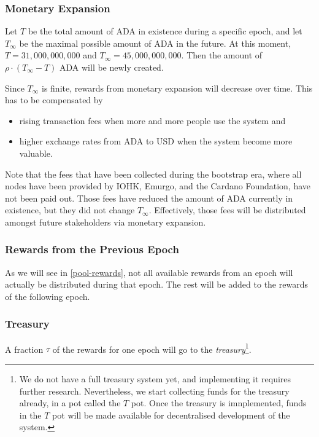 \documentclass[11pt,a4paper]{article}
\begin{document}
\subsubsection{Monetary Expansion}
\label{monetary-expansion}

Let \(T\) be the total amount of ADA in existence during a specific
epoch, and let \(T_\infty\) be the maximal possible amount of ADA in the
future. At this moment, \(T=31,000,000,000\) and
\(T_\infty=45,000,000,000\). Then the amount of
\(\rho\cdot(T_\infty - T)\) ADA will be newly created.

Since \(T_\infty\) is finite, rewards from monetary expansion will
decrease over time. This has to be compensated by

\begin{itemize}
\item
  rising transaction fees when more and more people use the system and
\item
  higher exchange rates from ADA to USD when the system become more
  valuable.
\end{itemize}

Note that the fees that have been collected during the bootstrap era,
where all nodes have been provided by IOHK, Emurgo, and the Cardano
Foundation, have not been paid out. Those fees have reduced the amount
of ADA currently in existence, but they did not change
\(T_\infty\). Effectively, those fees will be distributed amongst
future stakeholders via monetary expansion.

\subsubsection{Rewards from the Previous Epoch}
\label{rewards-from-the-previous-epoch}

As we will see in \cref{pool-rewards}, not all available rewards
from an epoch will actually be distributed during that epoch. The rest
will be added to the rewards of the following epoch.

\subsubsection{Treasury}
\label{treasury}

A fraction \(\tau\) of the rewards for one epoch will go to the
\emph{treasury}\footnote{We do not have a full treasury system yet, and
  implementing it requires further research. Nevertheless, we start collecting
  funds for the treasury already, in a pot called the \(T\) pot. Once the
  treasury is imnplemented, funds in the \(T\) pot will be made available for
  decentralised development of the system.}.
\end{document}
